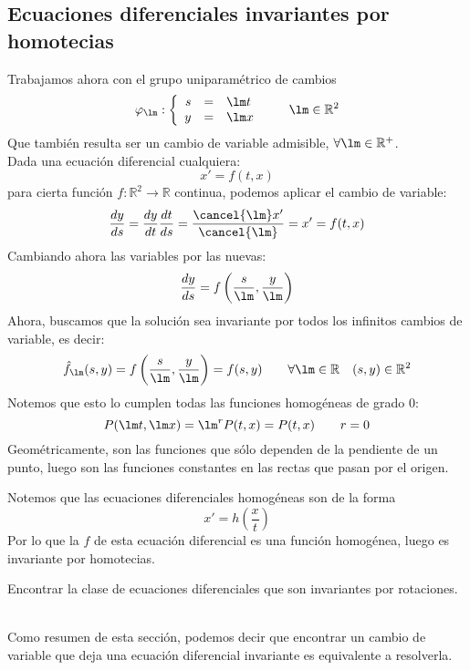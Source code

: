 \subsection{Ecuaciones diferenciales invariantes por homotecias}
Trabajamos ahora con el grupo uniparamétrico de cambios
\begin{equation*}
    \varphi_\lm: \left\{\begin{array}{rcl}
            s &= &\lm t \\
            y &= &\lm x
    \end{array}\right. \qquad \lm \in \mathbb{R}^2
\end{equation*}
Que también resulta ser un cambio de variable admisible, $\forall \lm \in \mathbb{R}^+$.\\

Dada una ecuación diferencial cualquiera:
\begin{equation*}
    x' = f(t,x)
\end{equation*}
para cierta función $f:\mathbb{R}^2\rightarrow\mathbb{R}$ continua, podemos aplicar el cambio de variable:
\begin{equation*}
    \dfrac{dy}{ds} = \dfrac{dy}{dt} \dfrac{dt}{ds} = \dfrac{\cancel{\lm} x'}{\cancel{\lm}} = x' = f(t,x)
\end{equation*}
Cambiando ahora las variables por las nuevas:
\begin{equation*}
    \dfrac{dy}{ds} = f\left(\dfrac{s}{\lm},\dfrac{y}{\lm}\right)
\end{equation*}
Ahora, buscamos que la solución sea invariante por todos los infinitos cambios de variable, es decir:
\begin{equation*}
    \hat{f}_\lm (s,y) = f\left(\dfrac{s}{\lm},\dfrac{y}{\lm}\right) = f(s,y) \qquad \forall \lm \in \mathbb{R} \quad (s,y) \in \mathbb{R}^2
\end{equation*}
Notemos que esto lo cumplen todas las funciones homogéneas de grado 0:
\begin{equation*}
    P(\lm t,\lm x) = \lm^r P(t,x) = P(t,x) \qquad r=0
\end{equation*}
Geométricamente, son las funciones que sólo dependen de la pendiente de un punto, luego son las funciones constantes en las rectas que pasan por el origen.

\begin{observacion}
    Notemos que las ecuaciones diferenciales homogéneas son de la forma
    \begin{equation*}
        x' = h\left(\dfrac{x}{t}\right)
    \end{equation*}
    Por lo que la $f$ de esta ecuación diferencial es una función homogénea, luego es invariante por homotecias.
\end{observacion}

\begin{ejercicio*}
    Encontrar la clase de ecuaciones diferenciales que son invariantes por rotaciones.
\end{ejercicio*}~\\

Como resumen de esta sección, podemos decir que encontrar un cambio de variable que deja una ecuación diferencial invariante es equivalente a resolverla.
